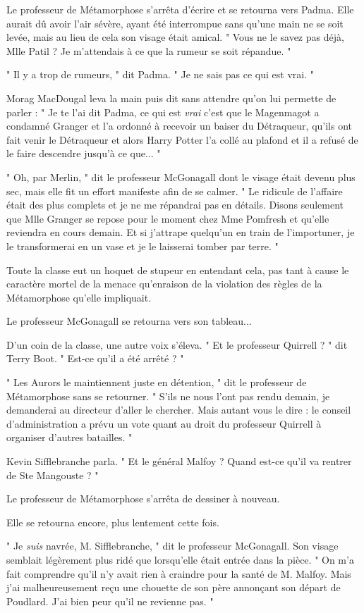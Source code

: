 Le professeur de Métamorphose s'arrêta d'écrire et se retourna vers Padma. Elle aurait dû avoir l'air sévère, ayant été interrompue sans qu'une main ne se soit levée, mais au lieu de cela son visage était amical. " Vous ne le savez pas déjà, Mlle Patil ? Je m'attendais à ce que la rumeur se soit répandue. "

" Il y a trop de rumeurs, " dit Padma. " Je ne sais pas ce qui est vrai. "

Morag MacDougal leva la main puis dit sans attendre qu'on lui permette de parler : " Je te l'ai dit Padma, ce qui est \emph{vrai}  c'est que le Magenmagot a condamné Granger et l'a ordonné à recevoir un baiser du Détraqueur, qu'ils ont fait venir le Détraqueur et alors Harry Potter l'a collé au plafond et il a refusé de le faire descendre jusqu'à ce que... "

" Oh, par Merlin, " dit le professeur McGonagall dont le visage était devenu plus sec, mais elle fit un effort manifeste afin de se calmer. " Le ridicule de l'affaire était des plus complets et je ne me répandrai pas en détails. Disons seulement que Mlle Granger se repose pour le moment chez Mme Pomfresh et qu'elle reviendra en cours demain. Et si j'attrape quelqu'un en train de l'importuner, je le transformerai en un vase et je le laisserai tomber par terre. "

Toute la classe eut un hoquet de stupeur en entendant cela, pas tant à cause le caractère mortel de la menace qu'enraison de la violation des règles de la Métamorphose qu'elle impliquait.

Le professeur McGonagall se retourna vers son tableau...

D'un coin de la classe, une autre voix s'éleva. " Et le professeur Quirrell ? " dit Terry Boot. " Est-ce qu'il a été arrêté ? "

" Les Aurors le maintiennent juste en détention, " dit le professeur de Métamorphose sans se retourner. " S'ils ne nous l'ont pas rendu demain, je demanderai au directeur d'aller le chercher. Mais autant vous le dire : le conseil d'administration a prévu un vote quant au droit du professeur Quirrell à organiser d'autres batailles. "

Kevin Sifflebranche parla. " Et le général Malfoy ? Quand est-ce qu'il va rentrer de Ste Mangouste ? "

Le professeur de Métamorphose s'arrêta de dessiner à nouveau.

Elle se retourna encore, plus lentement cette fois.

" Je \emph{suis}  navrée, M. Sifflebranche, " dit le professeur McGonagall. Son visage semblait légèrement plus ridé que lorsqu'elle était entrée dans la pièce. " On m'a fait comprendre qu'il n'y avait rien à craindre pour la santé de M. Malfoy. Mais j'ai malheureusement reçu une chouette de son père annonçant son départ de Poudlard. J'ai bien peur qu'il ne revienne pas. "

